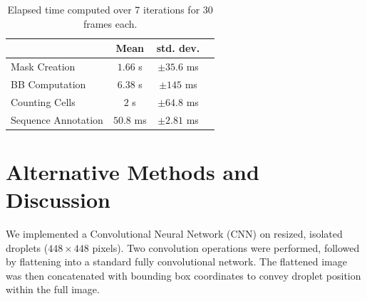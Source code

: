 \documentclass[12pt]{beamer}
\begin{document}
\begin{frame}[t]
\begin{multicols}{3}
\begin{table}
    \centering
    \begin{tabular}{l|ccc}
        & \textbf{Mean} & \textbf{std. dev.}\\
        \midrule
        Mask Creation &  $1.66$ s & $\pm35.6$ ms \\
        BB Computation & $6.38$ s & $\pm 145$ ms\\
        Counting Cells & $2$ s& $\pm 64.8$ ms\\
        Sequence Annotation & $50.8$ ms& $\pm 2.81$ ms\\
    \end{tabular}
    \caption{Elapsed time computed over 7 iterations for 30 frames each.}
\end{table}

\section{Alternative Methods and Discussion}

\begin{multicols}{2}
We implemented a Convolutional Neural Network (CNN) on resized, isolated droplets ($448 \times 448$ pixels). Two convolution operations were performed, followed by flattening into a standard fully convolutional network. The flattened image was then concatenated with bounding box coordinates to convey droplet position within the full image.


\end{multicols}
\end{multicols}
\end{frame}
\end{document}
